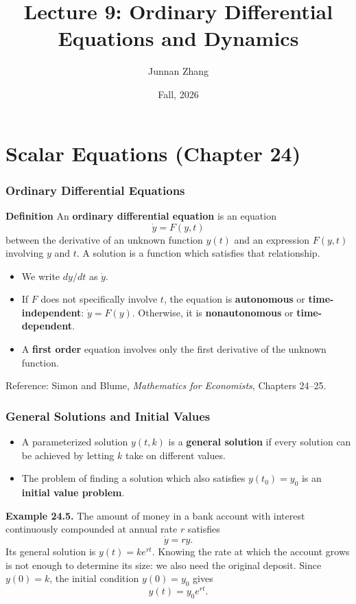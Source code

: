 \documentclass[9pt,aspectratio=169]{beamer}
\title[Lecture 9: ODE and Dynamics]{Lecture 9: Ordinary Differential Equations and Dynamics}
\author{Junnan Zhang}
\institute[Paula and Gregory Chow Institute for Studies in Economics\\
Xiamen University]
{
    Paula and Gregory Chow Institute for Studies in Economics \\ Xiamen University \\
    \medskip
}
\date{Fall, 2026}
\begin{document}
\begin{frame}
    \titlepage
\end{frame}

\section{Scalar Equations (Chapter 24)}

\begin{frame}
    \frametitle{Ordinary Differential Equations}
    \begin{block}{\textbf{Definition}}
        An \textbf{ordinary differential equation} is an equation
        \[
            \dot y=F(y,t)
        \]
        between the derivative of an unknown function $y(t)$ and an
        expression $F(y,t)$ involving $y$ and $t$. A solution is a function
        which satisfies that relationship.
    \end{block}
    \begin{itemize}
        \item We write $dy/dt$ as $\dot y$.
        \item If $F$ does not specifically involve $t$, the equation is
        \textbf{autonomous} or \textbf{time-independent}: $\dot y=F(y)$.
        Otherwise, it is \textbf{nonautonomous} or \textbf{time-dependent}.
        \item A \textbf{first order} equation involves only the first
        derivative of the unknown function.
    \end{itemize}
    \medskip
    Reference: Simon and Blume, \emph{Mathematics for Economists},
    Chapters 24--25.
\end{frame}

\begin{frame}
    \frametitle{General Solutions and Initial Values}
    \begin{itemize}
        \item A parameterized solution $y(t,k)$ is a \textbf{general
        solution} if every solution can be achieved by letting $k$ take
        on different values.
        \item The problem of finding a solution which also satisfies
        $y(t_0)=y_0$ is an \textbf{initial value problem}.
    \end{itemize}
    \medskip
    \textbf{Example 24.5.} The amount of money in a bank account with
    interest continuously compounded at annual rate $r$ satisfies
    \[
        \dot y=ry.
    \]
    Its general solution is $y(t)=ke^{rt}$. Knowing the rate at which
    the account grows is not enough to determine its size: we also
    need the original deposit. Since $y(0)=k$, the initial condition
    $y(0)=y_0$ gives
    \[
        y(t)=y_0e^{rt}.
    \]
\end{frame}
\end{document}
